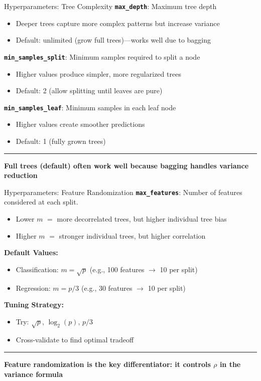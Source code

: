 \documentclass[8pt,aspectratio=169]{beamer}
\newcommand{\bottomnote}[1]{%
\vfill
\vspace{-2mm}
\textcolor{mllavender2}{\rule{\textwidth}{0.4pt}}
\vspace{1mm}
\footnotesize
\textbf{#1}
}
\begin{document}
\begin{frame}[t]{Hyperparameters: Tree Complexity}
\textbf{\texttt{max\_depth}}: Maximum tree depth
\begin{itemize}
\item Deeper trees capture more complex patterns but increase variance
\item Default: unlimited (grow full trees)---works well due to bagging
\end{itemize}

\vspace{0.3em}
\textbf{\texttt{min\_samples\_split}}: Minimum samples required to split a node
\begin{itemize}
\item Higher values produce simpler, more regularized trees
\item Default: 2 (allow splitting until leaves are pure)
\end{itemize}

\vspace{0.3em}
\textbf{\texttt{min\_samples\_leaf}}: Minimum samples in each leaf node
\begin{itemize}
\item Higher values create smoother predictions
\item Default: 1 (fully grown trees)
\end{itemize}
\bottomnote{Full trees (default) often work well because bagging handles variance reduction}
\end{frame}

\begin{frame}[t]{Hyperparameters: Feature Randomization}
\textbf{\texttt{max\_features}}: Number of features considered at each split.
\begin{itemize}
\item Lower $m$ $=$ more decorrelated trees, but higher individual tree bias
\item Higher $m$ $=$ stronger individual trees, but higher correlation
\end{itemize}

\vspace{0.5em}
\textbf{Default Values:}
\begin{itemize}
\item Classification: $m = \sqrt{p}$ (e.g., 100 features $\rightarrow$ 10 per split)
\item Regression: $m = p/3$ (e.g., 30 features $\rightarrow$ 10 per split)
\end{itemize}

\vspace{0.3em}
\textbf{Tuning Strategy:}
\begin{itemize}
\item Try: $\sqrt{p}$, $\log_2(p)$, $p/3$
\item Cross-validate to find optimal tradeoff
\end{itemize}
\bottomnote{Feature randomization is the key differentiator: it controls $\rho$ in the variance formula}
\end{frame}
\end{document}
